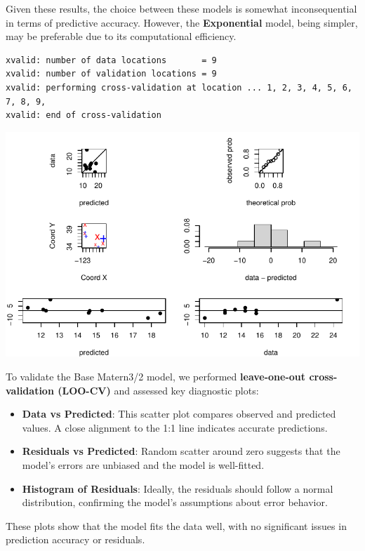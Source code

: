 \documentclass[
  11pt,
]{article}
\begin{document}
Given these results, the choice between these models is somewhat
inconsequential in terms of predictive accuracy. However, the
\textbf{Exponential} model, being simpler, may be preferable due to its
computational efficiency.

\begin{verbatim}
xvalid: number of data locations       = 9
xvalid: number of validation locations = 9
xvalid: performing cross-validation at location ... 1, 2, 3, 4, 5, 6, 7, 8, 9, 
xvalid: end of cross-validation
\end{verbatim}

\includegraphics{project_files/figure-pdf/unnamed-chunk-80-1.pdf}

To validate the Base Matern3/2 model, we performed \textbf{leave-one-out
cross-validation (LOO-CV)} and assessed key diagnostic plots:

\begin{itemize}
\item
  \textbf{Data vs Predicted}: This scatter plot compares observed and
  predicted values. A close alignment to the 1:1 line indicates accurate
  predictions.
\item
  \textbf{Residuals vs Predicted}: Random scatter around zero suggests
  that the model's errors are unbiased and the model is well-fitted.
\item
  \textbf{Histogram of Residuals}: Ideally, the residuals should follow
  a normal distribution, confirming the model's assumptions about error
  behavior.
\end{itemize}

These plots show that the model fits the data well, with no significant
issues in prediction accuracy or residuals.
\end{document}
